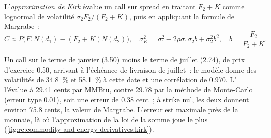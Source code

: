 \begin{definition}\label{def:rc:commodity-and-energy-derivatives:kirk}
L'\emph{approximation de Kirk} évalue un call sur spread en traitant
$F_2+K$ comme lognormal de volatilité $\sigma_2F_2/(F_2+K)$, puis en appliquant la formule de Margrabe~:
\[
C \approx P\bigl(F_1N(d_1)-(F_2+K)N(d_2)\bigr),\quad \sigma_K^2 = \sigma_1^2-2\rho\sigma_1\sigma_2b+\sigma_2^2b^2,\quad b = \frac{F_2}{F_2+K}.
\]
\end{definition}

\label{lst:rc:commodity-and-energy-derivatives:kirk}

\begin{example}\label{ex:rc:commodity-and-energy-derivatives:cal}
Un call sur le terme de janvier (3.50) moins le terme de juillet (2.74), de prix d'exercice 0.50, arrivant
à l'échéance de livraison de juillet~: le modèle donne des volatilités de 34.8~\% et 58.1~\% à cette date et une
corrélation de 0.970. L' l'évalue à 29.41 cents par MMBtu, contre
29.78 par la méthode de Monte-Carlo (erreur type 0.01), soit une erreur de 0.38 cent~; à strike nul, les deux donnent
environ 75.8 cents, la valeur de Margrabe. L'erreur est maximale près de la monnaie, là où l'approximation de la
loi de la somme joue le plus (\cref{fig:rc:commodity-and-energy-derivatives:kirk}).
\end{example}

